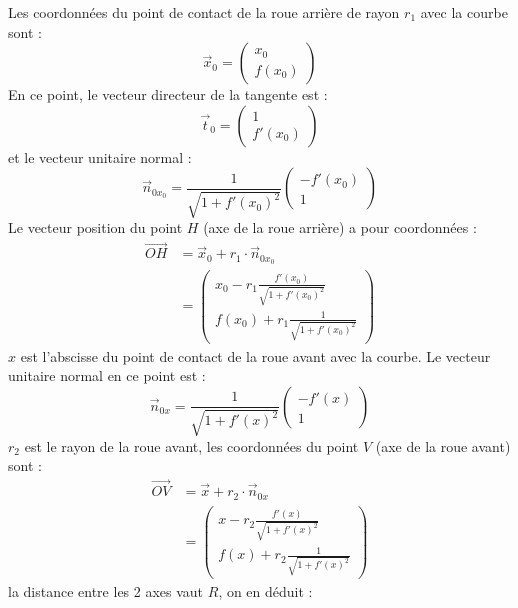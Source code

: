 \documentclass[11pt,english,BCOR=10mm,DIV=12,bibliography=totoc,parskip=false,headings=small,
    headinclude=false,footinclude=false,oneside]{pst-doc}
\begin{document}
Les coordonnées du point de contact de la roue arrière de rayon $r_1$ avec la courbe sont :
\begin{equation*}
\vec{x}_0=
\begin{pmatrix}
x_0\\
f(x_0)
\end{pmatrix}
\end{equation*}
En ce point, le vecteur directeur de la tangente est :
\begin{equation*}
\vec{t}_0=
\begin{pmatrix}
1\\
f'(x_0)
\end{pmatrix}
\end{equation*}
et le vecteur unitaire normal :
\begin{equation*}
\vec{n}_{0x_0}=\frac{1}{\sqrt{1+f'(x_0)^2}}
\begin{pmatrix}
-f'(x_0)\\
1
\end{pmatrix}
\end{equation*}
Le vecteur position du point $H$ (axe de la roue arrière) a pour coordonnées :
\begin{align*}
\overrightarrow{OH}&=\vec{x}_0+r_1\cdot \vec{n}_{0x_0}\\
&=\begin{pmatrix}
x_0-r_1\frac{f'(x_0)}{\sqrt{1+f'(x_0)^2}}\\
f(x_0)+r_1\frac{1}{\sqrt{1+f'(x_0)^2}}
\end{pmatrix}
\end{align*}
$x$ est l'abscisse du point de contact de la roue avant avec la courbe.
Le vecteur unitaire normal en ce point est :
\begin{equation*}
\vec{n}_{0x}=\frac{1}{\sqrt{1+f'(x)^2}}
\begin{pmatrix}
-f'(x)\\
1
\end{pmatrix}
\end{equation*}
$r_2$ est le rayon de la roue avant, les coordonnées du point $V$ (axe de la roue avant)  sont :
\begin{align*}
\overrightarrow{OV}&=\vec{x}+r_2\cdot \vec{n}_{0x}\\
&=\begin{pmatrix}
x-r_2\frac{f'(x)}{\sqrt{1+f'(x)^2}}\\
f(x)+r_2\frac{1}{\sqrt{1+f'(x)^2}}
\end{pmatrix}
\end{align*}
la distance entre les 2 axes vaut $R$, on en déduit :
\end{document}

